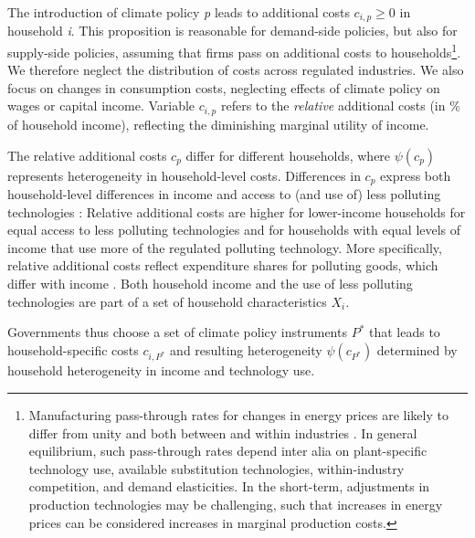 \documentclass[12pt, a4paper]{article}
\begin{document}
The introduction of climate policy \textit{p} leads to additional costs $c_{i,p}\geq 0$ in household \textit{i}. This proposition is reasonable for demand-side policies, but also for supply-side policies, assuming that firms pass on additional costs to households\footnote{Manufacturing pass-through rates for changes in energy prices are likely to differ from unity and both between and within industries \autocite{Ganapati.2020,Cludius.2020}. In general equilibrium, such pass-through rates depend inter alia on plant-specific technology use, available substitution technologies, within-industry competition, and demand elasticities. In the short-term, adjustments in production technologies may be challenging, such that increases in energy prices can be considered increases in marginal production costs.}. We therefore neglect the distribution of costs across regulated industries. We also focus on changes in consumption costs, neglecting effects of climate policy on wages or capital income. Variable $c_{i,p}$ refers to the \textit{relative} additional costs (in \% of household income), reflecting the diminishing marginal utility of income.

The relative additional costs $c_{p}$ differ for different households, where $\psi(c_{p})$ represents heterogeneity in household-level costs. Differences in $c_{p}$ express both household-level differences in income and access to (and use of) less polluting technologies \autocite{Hansel.2022}: Relative additional costs are higher for lower-income households for equal access to less polluting technologies and for households with equal levels of income that use more of the regulated polluting technology. More specifically, relative additional costs reflect expenditure shares for polluting goods, which differ with income \autocite{Jacobs.2019,Dorband.2019}. Both household income and the use of less polluting technologies are part of a set of household characteristics $X_{i}$. 

Governments thus choose a set of climate policy instruments $P^{\ast}$ that leads to household-specific costs $c_{i,P^{\ast}}$ and resulting heterogeneity $\psi(c_{P^{\ast}})$ determined by household heterogeneity in income and technology use.
\end{document}
